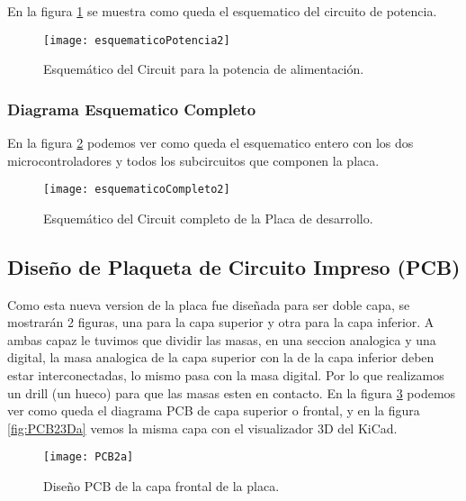En la figura \ref{fig:esquematicoPotencia2} se muestra como queda el esquematico del circuito de potencia.

\begin{figure}	
\centering
  \texttt{[image: esquematicoPotencia2]}
  \caption{Esquemático del Circuit para la potencia de alimentación.}\label{fig:esquematicoPotencia2}
\end{figure}


\subsubsection{Diagrama Esquematico Completo}
\label{subsubsection: esquematico_completo2}

En la figura \ref{fig:esquematicoCompleto2} podemos ver como queda el esquematico entero con los dos microcontroladores y todos los subcircuitos que componen la placa.

\begin{figure}	
\centering
  \texttt{[image: esquematicoCompleto2]}
  \caption{Esquemático del Circuit completo de la Placa de desarrollo.}\label{fig:esquematicoCompleto2}
\end{figure}




\subsection{Diseño de Plaqueta de Circuito Impreso (PCB)}
\label{ subsection: diseño_pcb2}

Como esta nueva version de la placa fue diseñada para ser doble capa, se mostrarán 2 figuras, una para la capa superior y otra para la capa inferior. 
A ambas capaz le tuvimos que dividir las masas, en una seccion analogica y una digital, la masa analogica de la capa superior con la de la capa inferior deben estar interconectadas, lo mismo pasa con la masa digital. Por lo que realizamos un drill (un hueco) para que las masas esten en contacto.
En la figura \ref{fig:PCB2a} podemos ver como queda el diagrama PCB de capa superior o frontal, y en la figura \ref{fig:PCB23Da} vemos la misma capa con el visualizador 3D del KiCad.

\begin{figure}	
\centering
  \texttt{[image: PCB2a]}
  \caption{Diseño PCB de la capa frontal de la placa.}\label{fig:PCB2a}
\end{figure}

